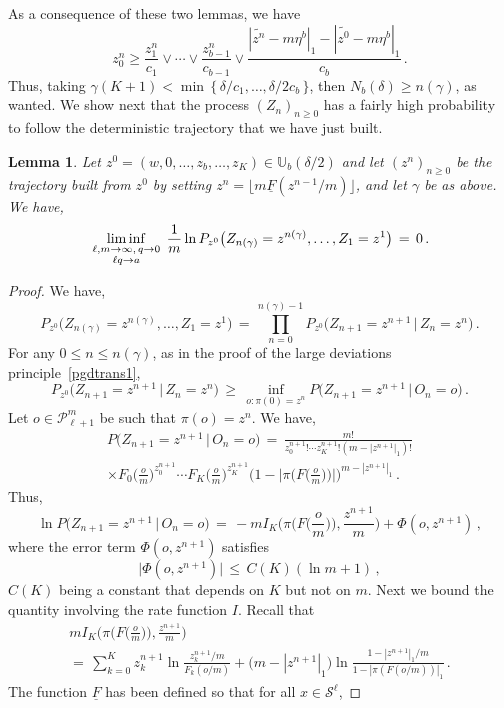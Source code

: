 \documentclass[a4paper,12pt]{article}
\newtheorem{lemma}[theorem]{Lemma}
\theoremstyle{definition}
\theoremstyle{remark}
\def \cP {\mathcal{P}}
\def \cS {\mathcal{S}}
\def \g {\gamma}
\def \d {\delta}
\def \dU {\mathbb{U}}
\def \pml {\cP^m_{\ell +1}}
\def\lmqq {{\genfrac{}{}{0pt}{1}{\ell,m\to\infty,\,q\to0}{\ell q\to a}}}
\begin{document}
As a consequence of these two lemmas,
we have 
$$z^n_0\geq
\frac{z^n_1}{c_1}\vee\cdots\vee\frac{z^n_{b-1}}{c_{b-1}}\vee
\frac{|\widetilde{z^n}-m\eta^b|_1-|\widetilde{z^0}-m\eta^b|_1}{c_b}\,.$$
Thus, taking $\g(K+1)<\min\,\lbrace\,\d/c_1,\dots,\d/2c_b\,\rbrace$,
then $N_b(\d)\geq n(\g)$, as wanted.
We show next that the process $(Z_n)_{n\geq0}$
has a fairly high probability to follow the deterministic
trajectory that we have just built.
\begin{lemma}
Let $z^0=(w,0,\dots,z_b,\dots,z_K)\in\dU_b(\d/2)$
and let $(z^n)_{n\geq0}$ be the trajectory built from $z^0$ 
by setting $z^n=\lfloor m\underline{F}(z^{n-1}/m)\rfloor $,
and let $\g$ be as above.
 We have,
 $$\liminf_\lmqq\,\frac{1}{m}\ln P_{z^0}\big(
Z_{n(\g)}=z^{n(\g)},\dots,Z_1=z^1\big)\,=\,0\,.$$
 \end{lemma}
\begin{proof}
We have,
$$
P_{z^0}\big(
Z_{n(\g)}=z^{n(\g)},\dots,Z_1=z^1
\big)\,=\,
\prod_{n=0}^{n(\g)-1}P_{z^0}\big(
Z_{n+1}=z^{n+1}\,\big|\,Z_n=z^n
\big)\,.
$$
For any $0\leq n\leq n(\g)$, 
as in the proof of the large deviations
principle~\ref{pgdtrans1}, 
$$P_{z^0}\big(
Z_{n+1}=z^{n+1}\,\big|\,Z_n=z^n
\big)\,\geq\,\inf_{o:\pi(0)=z^n}
P\big(
Z_{n+1}=z^{n+1}\,\big|\,O_n=o
\big)\,.$$
Let $o\in\pml$
be such that $\pi(o)=z^n$. We have,
\begin{multline*}
P\big(
Z_{n+1}=z^{n+1}\,\big|\,O_n=o
\big)\,=\,
\frac{m!}{z^{n+1}_0!\cdots z^{n+1}_K!
(m-|z^{n+1}|_1)!}\\
\times
F_0\Big(
\frac{o}{m}
\Big)^{z^{n+1}_0}\cdots
F_K\Big(
\frac{o}{m}
\Big)^{z^{n+1}_K}\bigg(
1-\bigg|
\pi\Big(
F \Big(
\frac{o}{m}
\Big)
\Big)
\bigg|
\bigg)^{m-|z^{n+1}|_1}\,.
\end{multline*}
Thus,
$$
\ln P\big(
Z_{n+1}=z^{n+1}\,\big|\,O_n=o
\big)\,=\,-mI_K\bigg(
\pi\Big(
F\Big(
\frac{o}{m}
\Big)
\Big),\frac{z^{n+1}}{m}
\bigg)+\Phi(o,z^{n+1})\,,
$$
where the error term $\Phi(o,z^{n+1})$
satisfies
$$
\big|\Phi(o,z^{n+1})\big|\,\leq\, C(K)(\ln m+1)\,,$$
$C(K)$ being a constant that depends on $K$ but not on $m$.
Next we bound the quantity involving
the rate function $I$.
Recall that 
\begin{multline*}
mI_K\bigg(
\pi\Big(
F\Big(
\frac{o}{m}
\Big)
\Big),\frac{z^{n+1}}{m}
\bigg)\\=\,
\sum_{k=0}^K
z^{n+1}_k\ln\frac{z^{n+1}_k/m}{F_k(o/m)}+
\big(
m-|z^{n+1}|_1
\big)\ln\frac{1-|z^{n+1}|_1/m}
{1-|\pi(F(o/m))|_1}\,.
\end{multline*}
The function $\underline{F}$
has been defined so that for all $x\in\cS^\ell$,

\end{proof}
\end{document}

